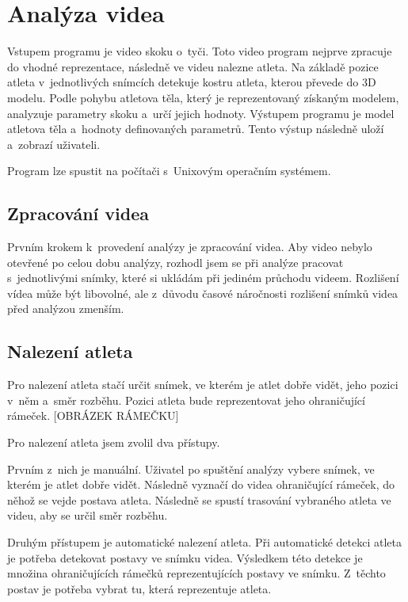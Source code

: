 \section{Analýza videa}

Vstupem programu je video skoku o~tyči. Toto video program nejprve zpracuje do vhodné reprezentace, následně ve videu nalezne atleta. Na základě pozice atleta v~jednotlivých snímcích detekuje kostru atleta, kterou převede do 3D modelu. Podle pohybu atletova těla, který je reprezentovaný získaným modelem, analyzuje parametry skoku a~určí jejich hodnoty. Výstupem programu je model atletova těla a~hodnoty definovaných parametrů. Tento výstup následně uloží a~zobrazí uživateli.

Program lze spustit na počítači s~Unixovým operačním systémem.



\subsection{Zpracování videa}

Prvním krokem k~provedení analýzy je zpracování videa. Aby video nebylo otevřené po celou dobu analýzy, rozhodl jsem se při analýze pracovat s~jednotlivými snímky, které si ukládám při jediném průchodu videem. Rozlišení vídea může být libovolné, ale z~důvodu časové náročnosti rozlišení snímků videa před analýzou zmenším.



\subsection{Nalezení atleta}

Pro nalezení atleta stačí určit snímek, ve kterém je atlet dobře vidět, jeho pozici v~něm a~směr rozběhu. Pozici atleta bude reprezentovat jeho ohraničující rámeček. [OBRÁZEK RÁMEČKU]

Pro nalezení atleta jsem zvolil dva přístupy.

Prvním z~nich je manuální. Uživatel po spuštění analýzy vybere snímek, ve kterém je atlet dobře vidět. Následně vyznačí do videa ohraničující rámeček, do něhož se vejde postava atleta. Následně se spustí trasování vybraného atleta ve videu, aby se určil směr rozběhu.

Druhým přístupem je automatické nalezení atleta. Při automatické detekci atleta je potřeba detekovat postavy ve snímku videa. Výsledkem této detekce je množina ohraničujících rámečků reprezentujících postavy ve snímku. Z~těchto postav je potřeba vybrat tu, která reprezentuje atleta.

